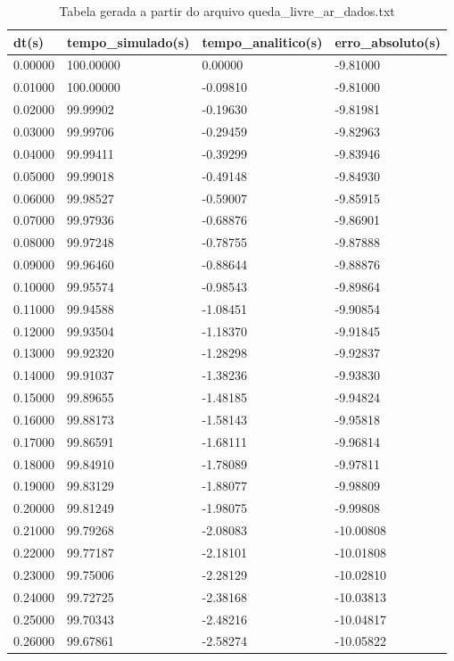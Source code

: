 \begin{table}
\caption{Tabela gerada a partir do arquivo queda_livre_ar_dados.txt}
\label{tab:queda_livre_ar_dados}
\begin{tabular}{llll}
\toprule
dt(s) & tempo_simulado(s) & tempo_analitico(s) & erro_absoluto(s) \\
\midrule
0.00000 & 100.00000 & 0.00000 & -9.81000 \\
0.01000 & 100.00000 & -0.09810 & -9.81000 \\
0.02000 & 99.99902 & -0.19630 & -9.81981 \\
0.03000 & 99.99706 & -0.29459 & -9.82963 \\
0.04000 & 99.99411 & -0.39299 & -9.83946 \\
0.05000 & 99.99018 & -0.49148 & -9.84930 \\
0.06000 & 99.98527 & -0.59007 & -9.85915 \\
0.07000 & 99.97936 & -0.68876 & -9.86901 \\
0.08000 & 99.97248 & -0.78755 & -9.87888 \\
0.09000 & 99.96460 & -0.88644 & -9.88876 \\
0.10000 & 99.95574 & -0.98543 & -9.89864 \\
0.11000 & 99.94588 & -1.08451 & -9.90854 \\
0.12000 & 99.93504 & -1.18370 & -9.91845 \\
0.13000 & 99.92320 & -1.28298 & -9.92837 \\
0.14000 & 99.91037 & -1.38236 & -9.93830 \\
0.15000 & 99.89655 & -1.48185 & -9.94824 \\
0.16000 & 99.88173 & -1.58143 & -9.95818 \\
0.17000 & 99.86591 & -1.68111 & -9.96814 \\
0.18000 & 99.84910 & -1.78089 & -9.97811 \\
0.19000 & 99.83129 & -1.88077 & -9.98809 \\
0.20000 & 99.81249 & -1.98075 & -9.99808 \\
0.21000 & 99.79268 & -2.08083 & -10.00808 \\
0.22000 & 99.77187 & -2.18101 & -10.01808 \\
0.23000 & 99.75006 & -2.28129 & -10.02810 \\
0.24000 & 99.72725 & -2.38168 & -10.03813 \\
0.25000 & 99.70343 & -2.48216 & -10.04817 \\
0.26000 & 99.67861 & -2.58274 & -10.05822 \\

\end{tabular}
\end{table}
